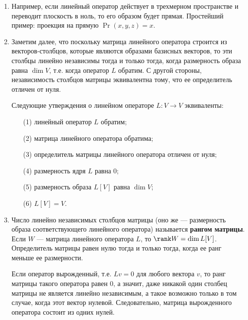 \begin{enumerate}
\item Например, если линейный оператор действует в трехмерном пространстве и переводит плоскость в ноль, то его образом будет прямая. Простейший пример: проекция на прямую $\Pr(x,y,z) = x$. 
\item Заметим далее, что поскольку матрица линейного оператора строится из векторов-столбцов, которые являются образами базисных векторов, то эти столбцы линейно независимы тогда и только тогда, когда размерность образа равна $\dim V$, т.е. когда оператор $L$ обратим. С другой стороны, независимость столбцов матрицы эквивалентна тому, что ее определитель отличен от нуля.
\begin{thrm} Следующие утверждения о линейном операторе $L:V\to V$ эквиваленты:
\begin{enumerate}[\textup{(1)}]
\item[\textup{(1)}] линейный оператор $L$ обратим;
\item[\textup{(2)}] матрица линейного оператора обратима;
\item[\textup{(3)}] определитель матрицы линейного оператора отличен от нуля;
\item[\textup{(4)}] размерность ядря $L$ равна 0;
\item[\textup{(5)}] размерность образа $L[V]$ равна $\dim V$;
\item[\textup{(6)}] $L[V]=V$.
\end{enumerate}
\end{thrm}
\item Число линейно независимых столбцов матрицы (оно же --- размерность образа соответствующего линейного оператора) называется \textbf{рангом матрицы}. Если $W$ --- матрица линейного оператора $L$, то $\rank W=\dim L[V]$. Определитель матрицы равен нулю тогда и только тогда, когда ее ранг меньше ее размерности.

Если оператор вырожденный, т.е. $Lv=0$ для любого вектора $v$, то ранг матрицы такого оператора равен 0, а значит, даже никакой один столбец матрицы не является линейно независимым, а такое возможно только в том случае, когда этот вектор нулевой. Следовательно, матрица вырожденного оператора состоит из одних нулей.
\end{enumerate}

